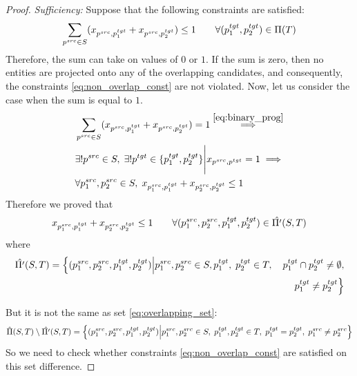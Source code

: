 \begin{proof}
  \textit{Sufficiency:}
  Suppose that the following constraints are satisfied:
  \[
    \sum\limits_{p^{src} \in S} (x_{p^{src}, p_1^{tgt}} + x_{p^{src}, p_2^{tgt}}) \leq 1
    \qquad \forall (p_1^{tgt}, p_2^{tgt}) \in \Pi(T)
  \]
  Therefore, the sum can take on values of \( 0 \) or \( 1 \).
  If the sum is zero, then no entities are projected onto any of the overlapping
  candidates, and consequently, the constraints \eqref{eq:non_overlap_const} are
  not violated. Now, let us consider the case when the sum is equal to \( 1 \).
  \begin{equation*} \label{eq:derivation_of_const_reduction}
    \begin{aligned}
      & \sum\limits_{p^{src} \in S} (x_{p^{src}, p_1^{tgt}} + x_{p^{src}, p_2^{tgt}}) = 1
      \stackrel{\eqref{eq:binary_prog}}{\implies}                                                       \\
      & \exists! p^{src} \in S, \; \exists! p^{tgt} \in \{ p_1^{tgt}, p_2^{tgt}\}
      \Bigg| x_{p^{src}, p^{tgt}} = 1 \implies                                                          \\
      & \forall p_1^{src}, p_2^{src} \in S, \; x_{p_1^{src}, p_1^{tgt}} + x_{p_2^{src}, p_2^{tgt}} \leq 1
    \end{aligned}
  \end{equation*}
  Therefore we proved that
  \[
    x_{p_1^{src}, p_1^{tgt}} + x_{p_2^{src}, p_2^{tgt}} \leq 1 \qquad
    \forall (p_1^{src}, p_2^{src}, p_1^{tgt}, p_2^{tgt}) \in \hat{\Pi'}(S, T)
  \]
  where
  \begin{align*}
    \hat{\Pi'}(S, T) = \Big\{ (p_1^{src}, p_2^{src}, p_1^{tgt}, p_2^{tgt}) \Big|
      p_1^{src}, p_2^{src} \in S, p_1^{tgt}, \;
      p_2^{tgt} \in T, \quad p_1^{tgt} \cap p_2^{tgt} \neq \emptyset, \\
    p_1^{tgt} \neq p_2^{tgt} \Big\}
  \end{align*}

  But it is not the same as set \eqref{eq:overlapping_set}:
  \[
    \hat{\Pi}(S, T) \setminus \hat{\Pi'}(S, T) = \Big\{ (p_1^{src}, p_2^{src}, p_1^{tgt}, p_2^{tgt}) \Big|
      p_1^{src}, p_2^{src} \in S, \; p_1^{tgt}, p_2^{tgt} \in T, \; p_1^{tgt} = p_2^{tgt}, \;
    p_1^{src} \neq p_2^{src} \Big\}
  \]
  So we need to check whether constraints \eqref{eq:non_overlap_const} are satisfied on this set difference.


\end{proof}
